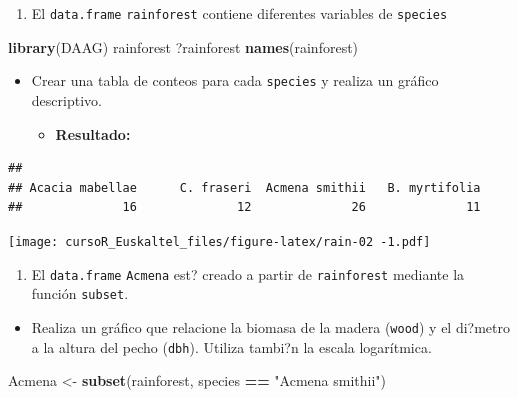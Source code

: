 \documentclass[]{book}
\newenvironment{Shaded}{\begin{snugshade}}{\end{snugshade}}
\newcommand{\KeywordTok}[1]{\textcolor[rgb]{0.13,0.29,0.53}{\textbf{#1}}}
\newcommand{\StringTok}[1]{\textcolor[rgb]{0.31,0.60,0.02}{#1}}
\newcommand{\OperatorTok}[1]{\textcolor[rgb]{0.81,0.36,0.00}{\textbf{#1}}}
\newcommand{\NormalTok}[1]{#1}
\providecommand{\tightlist}{%
  \setlength{\itemsep}{0pt}\setlength{\parskip}{0pt}}
\begin{document}
\begin{enumerate}
\def\labelenumi{\arabic{enumi}.}
\setcounter{enumi}{1}
\tightlist
\item
  El \texttt{data.frame} \texttt{rainforest} contiene diferentes
  variables de \texttt{species}
\end{enumerate}

\begin{Shaded}
\begin{Highlighting}[]
\KeywordTok{library}\NormalTok{(DAAG)}
\NormalTok{rainforest}
\NormalTok{?rainforest}
\KeywordTok{names}\NormalTok{(rainforest)}
\end{Highlighting}
\end{Shaded}

\begin{itemize}
\item
  Crear una tabla de conteos para cada \texttt{species} y realiza un
  gráfico descriptivo.

  \begin{itemize}
  \tightlist
  \item
    \textbf{Resultado:}
  \end{itemize}
\end{itemize}

\begin{verbatim}
## 
## Acacia mabellae      C. fraseri  Acmena smithii   B. myrtifolia 
##              16              12              26              11
\end{verbatim}

\texttt{[image: cursoR\_Euskaltel\_files/figure-latex/rain-02 -1.pdf]}

\begin{enumerate}
\def\labelenumi{\arabic{enumi}.}
\setcounter{enumi}{2}
\tightlist
\item
  El \texttt{data.frame} \texttt{Acmena} est? creado a partir de
  \texttt{rainforest} mediante la función \texttt{subset}.
\end{enumerate}

\begin{itemize}
\tightlist
\item
  Realiza un gráfico que relacione la biomasa de la madera
  (\texttt{wood}) y el di?metro a la altura del pecho (\texttt{dbh}).
  Utiliza tambi?n la escala logarítmica.
\end{itemize}

\begin{Shaded}
\begin{Highlighting}[]
\NormalTok{Acmena <-}\StringTok{ }\KeywordTok{subset}\NormalTok{(rainforest, species }\OperatorTok{==}\StringTok{ "Acmena smithii"}\NormalTok{)}
\end{Highlighting}
\end{Shaded}
\end{document}
